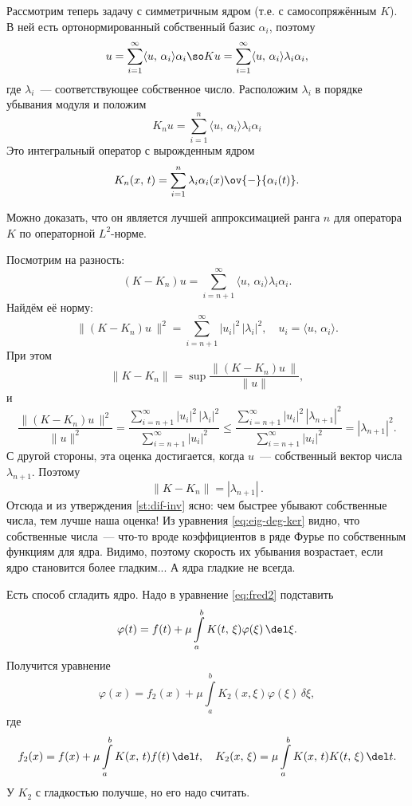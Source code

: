 \documentclass{trlnotes}
\begin{document}
    \begin{rem}
        Рассмотрим теперь задачу с симметричным ядром (т.е. с самосопряжённым $K$). В ней есть ортонормированный собственный базис $\alpha_i$, поэтому
        \[
            u = \sum\limits_{i = 1}^{\infty} \langle u, \, \alpha_i \rangle \alpha_i \so Ku = \sum\limits_{i = 1}^{\infty} \langle u, \, \alpha_i \rangle \lambda_i \alpha_i,
        \]
        где $\lambda_i$~--- соответствующее собственное число. Расположим $\lambda_i$ в порядке убывания модуля и положим
        \[
            K_n u = \sum\limits_{i = 1}^{n} \langle u, \, \alpha_i \rangle \lambda_i \alpha_i
        \]
        Это интегральный оператор с вырожденным ядром
        \begin{equation}\label{eq:eig-deg-ker}
            K_n(x, \, t) = \sum\limits_{i = 1}^n \lambda_i \alpha_i(x) \ov{-}{\alpha_i(t)}.
        \end{equation}

        Можно доказать, что он является лучшей аппроксимацией ранга $n$ для оператора $K$ по операторной $L^2$-норме.

        Посмотрим на разность:
        \[
            (K - K_n)u = \sum\limits_{i = n+1}^{\infty} \langle u, \, \alpha_i \rangle \lambda_i \alpha_i.
        \]
        Найдём её норму:
        \[
            \big\|(K - K_n)u \,\big\|^2 = \sum\limits_{i = n + 1}^{\infty} |u_i|^2 \, |\lambda_i|^2, \quad u_i = \langle u, \, \alpha_i \rangle.
        \]
        При этом
        \[
            \|K - K_n\| = \sup \dfrac{\big\|(K - K_n)u \,\big\|}{\|u\|},
        \]
        и
        \[
            \dfrac{\big\|(K - K_n)u \,\big\|^2}{\|u\|^2} = \dfrac{\sum\limits_{i = n + 1}^{\infty} |u_i|^2 \, |\lambda_i|^2}{\sum\limits_{i = n + 1}^{\infty} |u_i|^2} \leqslant \dfrac{\sum\limits_{i = n + 1}^{\infty} |u_i|^2 \, |\lambda_{n + 1}|^2}{\sum\limits_{i = n + 1}^{\infty} |u_i|^2} = |\lambda_{n+1}|^2.
        \]
        С другой стороны, эта оценка достигается, когда $u$~--- собственный вектор числа $\lambda_{n+1}$. Поэтому
        \[
            \boxed{\|K - K_n\| = |\lambda_{n + 1}|} \, .
        \]
        Отсюда и из утверждения \ref{st:dif-inv} ясно: чем быстрее убывают собственные числа, тем лучше наша оценка! 
        Из уравнения \ref{eq:eig-deg-ker} видно, что собственные числа~--- что-то вроде коэффициентов в ряде Фурье по собственным функциям для ядра. Видимо, поэтому скорость их убывания возрастает, если ядро становится более гладким... А ядра гладкие не всегда.
    \end{rem}

    \begin{rem}
        Есть способ сгладить ядро. Надо в уравнение \ref{eq:fred2} подставить
        \[
            \varphi(t) = f(t) + \mu\int\limits_a^b K(t, \, \xi) \varphi(\xi) \, \del \xi.
        \]
        Получится уравнение
        \[
            \varphi(x) = f_2(x) + \mu\int\limits_a^b  K_2(x, \xi) \varphi(\xi) \, \delta \xi,
        \]
        где
        \[
            f_2(x) = f(x) + \mu \int\limits_a^b K(x, \, t) f(t) \, \del t, \quad K_2(x, \, \xi) = \mu \int\limits_a^b K(x, \, t) K(t, \, \xi) \, \del t. 
        \]
        У $K_2$ с гладкостью получше, но его надо считать.
    \end{rem}
\end{document}
